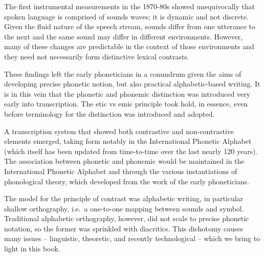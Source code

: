 

The first instrumental measurements in the 1870-80s showed unequivocally that spoken language is comprised of sounds waves; it is dynamic and not discrete. Given the fluid nature of the speech stream, sounds differ from one utterance to the next and the same sound may differ in different environments. However, many of these changes are predictable in the context of those environments and they need not necessarily form distinctive lexical contrasts.

These findings left the early phoneticians in a conundrum given the aims of developing precise phonetic notion, but also practical alphabetic-based writing. It is in this vein that the phonetic and phonemic distinction was introduced very early into transcription. The etic vs emic principle took hold, in essence, even before terminology for the distinction was introduced and adopted.

A transcription system that showed both contrastive and non-contrastive elements emerged, taking form notably in the International Phonetic Alphabet (which itself has been updated from time-to-time over the last nearly 120 years). The association between phonetic and phonemic would be maintained in the International Phonetic Alphabet and through the various instantiations of phonological theory, which developed from the work of the early phoneticians.

The model for the principle of contrast was alphabetic writing, in particular shallow orthography, i.e.\ a one-to-one mapping between sounds and symbol. Traditional alphabetic orthography, however, did not scale to precise phonetic notation, so the former was sprinkled with diacritics. This dichotomy  causes many issues -- linguistic, theoretic, and recently technological -- which we bring to light in this book.

